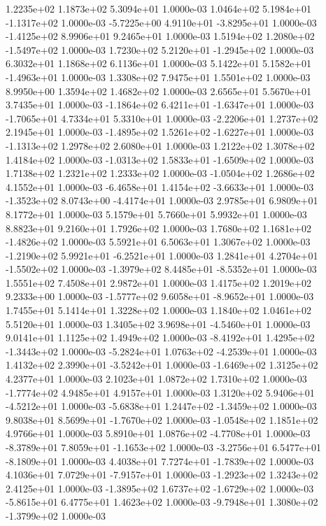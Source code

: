 1.2235e+02 1.1873e+02 5.3094e+01  1.0000e-03
 1.0464e+02  5.1984e+01 -1.1317e+02  1.0000e-03
-5.7225e+00  4.9110e+01 -3.8295e+01  1.0000e-03
-1.4125e+02  8.9906e+01  9.2465e+01  1.0000e-03
 1.5194e+02  1.2080e+02 -1.5497e+02  1.0000e-03
 1.7230e+02  5.2120e+01 -1.2945e+02  1.0000e-03
6.3032e+01 1.1868e+02 6.1136e+01  1.0000e-03
 5.1422e+01  5.1582e+01 -1.4963e+01  1.0000e-03
1.3308e+02 7.9475e+01 1.5501e+02  1.0000e-03
8.9950e+00 1.3594e+02 1.4682e+02  1.0000e-03
2.6565e+01 5.5670e+01 3.7435e+01  1.0000e-03
-1.1864e+02  6.4211e+01 -1.6347e+01  1.0000e-03
-1.7065e+01  4.7334e+01  5.3310e+01  1.0000e-03
-2.2206e+01  1.2737e+02  2.1945e+01  1.0000e-03
-1.4895e+02  1.5261e+02 -1.6227e+01  1.0000e-03
-1.1313e+02  1.2978e+02  2.6080e+01  1.0000e-03
1.2122e+02 1.3078e+02 1.4184e+02  1.0000e-03
-1.0313e+02  1.5833e+01 -1.6509e+02  1.0000e-03
1.7138e+02 1.2321e+02 1.2333e+02  1.0000e-03
-1.0504e+02  1.2686e+02  4.1552e+01  1.0000e-03
-6.4658e+01  1.4154e+02 -3.6633e+01  1.0000e-03
-1.3523e+02  8.0743e+00 -4.4174e+01  1.0000e-03
2.9785e+01 6.9809e+01 8.1772e+01  1.0000e-03
5.1579e+01 5.7660e+01 5.9932e+01  1.0000e-03
8.8823e+01 9.2160e+01 1.7926e+02  1.0000e-03
 1.7680e+02  1.1681e+02 -1.4826e+02  1.0000e-03
5.5921e+01 6.5063e+01 1.3067e+02  1.0000e-03
-1.2190e+02  5.9921e+01 -6.2521e+01  1.0000e-03
 1.2841e+01  4.2704e+01 -1.5502e+02  1.0000e-03
-1.3979e+02  8.4485e+01 -8.5352e+01  1.0000e-03
1.5551e+02 7.4508e+01 2.9872e+01  1.0000e-03
1.4175e+02 1.2019e+02 9.2333e+00  1.0000e-03
-1.5777e+02  9.6058e+01 -8.9652e+01  1.0000e-03
1.7455e+01 5.1414e+01 1.3228e+02  1.0000e-03
1.1840e+02 1.0461e+02 5.5120e+01  1.0000e-03
 1.3405e+02  3.9698e+01 -4.5460e+01  1.0000e-03
9.0141e+01 1.1125e+02 1.4949e+02  1.0000e-03
-8.4192e+01  1.4295e+02 -1.3443e+02  1.0000e-03
-5.2824e+01  1.0763e+02 -4.2539e+01  1.0000e-03
 1.4132e+02  2.3990e+01 -3.5242e+01  1.0000e-03
-1.6469e+02  1.3125e+02  4.2377e+01  1.0000e-03
2.1023e+01 1.0872e+02 1.7310e+02  1.0000e-03
-1.7774e+02  4.9485e+01  4.9157e+01  1.0000e-03
 1.3120e+02  5.9406e+01 -4.5212e+01  1.0000e-03
-5.6838e+01  1.2447e+02 -1.3459e+02  1.0000e-03
 9.8038e+01  8.5699e+01 -1.7670e+02  1.0000e-03
-1.0548e+02  1.1851e+02  4.9766e+01  1.0000e-03
 5.8910e+01  1.0876e+02 -4.7708e+01  1.0000e-03
-8.3789e+01  7.8059e+01 -1.1653e+02  1.0000e-03
-3.2756e+01  6.5477e+01 -8.1809e+01  1.0000e-03
 4.4038e+01  7.7274e+01 -1.7839e+02  1.0000e-03
 4.1036e+01  7.0729e+01 -7.9157e+01  1.0000e-03
-1.2923e+02  1.3243e+02  2.4125e+01  1.0000e-03
-1.3895e+02  1.6737e+02 -1.6729e+02  1.0000e-03
-5.8615e+01  6.4775e+01  1.4623e+02  1.0000e-03
-9.7948e+01  1.3080e+02 -1.3799e+02  1.0000e-03
